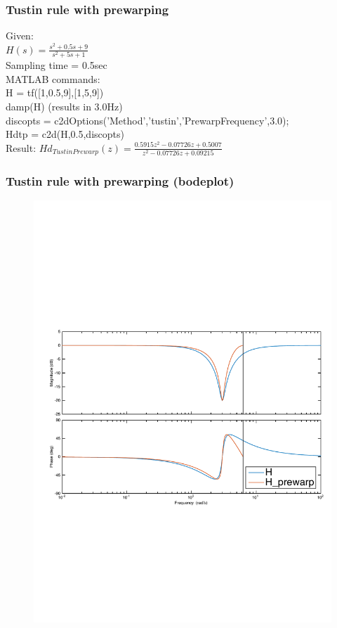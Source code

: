 \begin{frame}
	\frametitle{Tustin rule with prewarping}
	\begin{example}
		Given:\\
		$H(s) = \frac{s^{2} + 0.5s + 9}{s^{2} + 5s + 1}$\\
		Sampling time = 0.5sec\\
		\vspace{1em}
		MATLAB commands:\\
		H = tf([1,0.5,9],[1,5,9])\\
		damp(H) (results in 3.0Hz)\\
		discopts = c2dOptions('Method','tustin','PrewarpFrequency',3.0);\\
		Hdtp = c2d(H,0.5,discopts)\\
		\vspace{1em}
		Result:
		$Hd_{TustinPrewarp}(z) = \frac{0.5915z^{2} - 0.07726z + 0.5007}{z^{2} - 0.07726z + 0.09215}$
	\end{example}
\end{frame}

\begin{frame}
	\frametitle{Tustin rule with prewarping (bodeplot)}
	\vspace{-0.7em}
	\begin{figure}
		\centering
		\includegraphics[width=1\linewidth]{distortion_bode3}
	\end{figure}
\end{frame}


